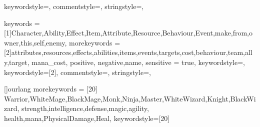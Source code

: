 
{
	keywordstyle=\color{blue},          %
	commentstyle=\color{dkgreen},       %
	stringstyle=\color{mauve},         %
}

{
	keywords = {[1]Character,Ability,Effect,Item,Attribute,Resource,Behaviour,Event,make,from,owner,this,self,enemy},
	morekeywords = {[2]attributes,resources,effects,abilities,items,events,targets,cost,behaviour,team,ally,target, mana_cost, positive, negative,name},
	sensitive = true,
	keywordstyle=\color{blue},          %
	keywordstyle={[2]\color{dkgreen}},
	commentstyle=\color{dkgreen},       %
	stringstyle=\color{mauve},         %
}

[]{ourlang}
{
	morekeywords = [20]{
		Warrior,WhiteMage,BlackMage,Monk,Ninja,Master,WhiteWizard,Knight,BlackWizard,
		strength,intelligence,defense,magic,agility,
		health,mana,PhysicalDamage,Heal},
	keywordstyle={[20]\color{orange}}
}